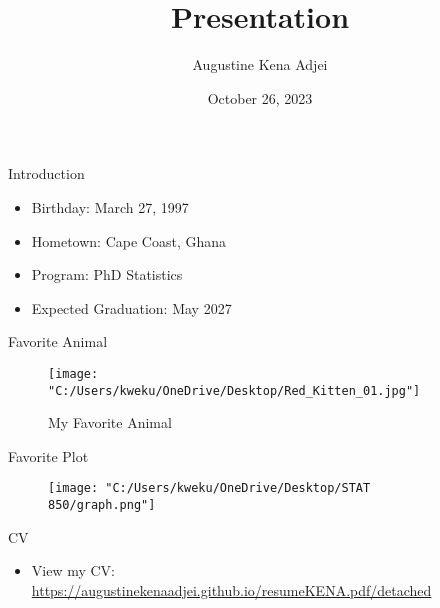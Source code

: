 \documentclass{beamer}
\title{Presentation}
\author{Augustine Kena Adjei}
\date{October 26, 2023}
\begin{document}
\frame{\titlepage}

\begin{frame}{Introduction}
\begin{itemize}
\item Birthday: March 27, 1997
\item Hometown: Cape Coast, Ghana
\item Program: PhD Statistics
\item Expected Graduation: May 2027
\end{itemize}
\end{frame}

\begin{frame}{Favorite Animal}
\begin{figure}
\texttt{[image: "C:/Users/kweku/OneDrive/Desktop/Red\_Kitten\_01.jpg"]}
\caption{My Favorite Animal}
\end{figure}
\end{frame}

\begin{frame}{Favorite Plot}
\begin{figure}
\texttt{[image: "C:/Users/kweku/OneDrive/Desktop/STAT 850/graph.png"]}
\end{figure}
\end{frame}

\begin{frame}{CV}
\begin{itemize}
\item View my CV: \url{https://augustinekenaadjei.github.io/resumeKENA.pdf/detached}
\end{itemize}
\end{frame}
\end{document}
